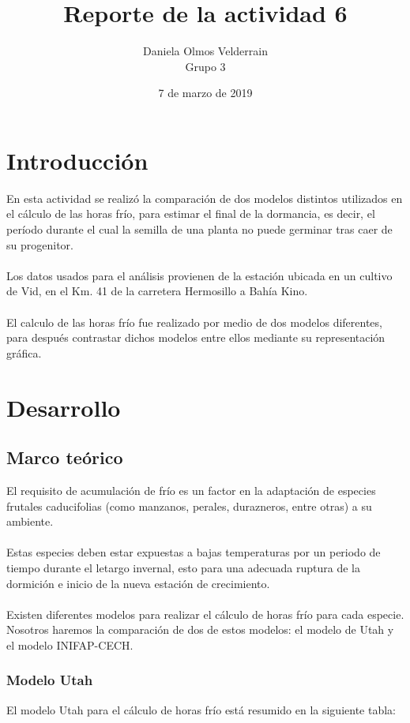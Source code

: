 \documentclass[letterpaper,12pt]{article}
\begin{document}
\title{Reporte de la actividad 6}
\author{Daniela Olmos Velderrain\\Grupo 3}
\date{7 de marzo de 2019}

\maketitle

\section{Introducción}
En esta actividad se realizó la comparación de dos modelos distintos utilizados en el cálculo de las horas frío, para estimar el final de la dormancia, es decir, el período durante el cual la semilla de una planta no puede germinar tras caer de su progenitor.
\\
\\
Los datos usados para el análisis provienen de la estación ubicada en un cultivo de Vid, en el Km. 41 de la carretera Hermosillo a Bahía Kino.
\\
\\
El calculo de las horas frío fue realizado por medio de dos modelos diferentes, para después contrastar dichos modelos entre ellos mediante su representación gráfica.  

\section{Desarrollo}
\subsection{Marco teórico}
El requisito de acumulación de frío es un factor en la adaptación de especies frutales caducifolias (como manzanos, perales, durazneros, entre otras) a su ambiente. 
\\
\\
Estas especies deben estar expuestas a bajas temperaturas por un periodo de tiempo durante el letargo invernal, esto para una adecuada ruptura de la dormición e inicio de la nueva estación de crecimiento. 
\\
\\
Existen diferentes modelos para realizar el cálculo de horas frío para cada especie. Nosotros haremos la comparación de dos de estos modelos: el modelo de Utah y el modelo INIFAP-CECH.

\subsubsection{Modelo Utah}
El modelo Utah para el cálculo de horas frío está resumido en la siguiente tabla:
\end{document}
